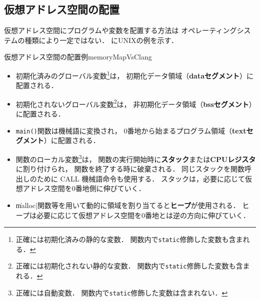 \subsection{仮想アドレス空間の配置}
仮想アドレス空間にプログラムや変数を配置する方法は
オペレーティングシステムの種類により一定ではない．
にUNIXの例を示す．

{仮想アドレス空間の配置例}{memoryMapVsClang}

\begin{itemize}
\item 初期化済みのグローバル変数\footnote{
正確には初期化済みの静的な変数．
関数内で{\tt static}修飾した変数も含まれる．}は，
初期化データ領域（{\bf dataセグメント}）に配置される．
\item 初期化されないグローバル変数\footnote{
正確には初期化されない静的な変数．
関数内で{\tt static}修飾した変数も含まれる．}は，
非初期化データ領域（{\bf bssセグメント}）に配置される．
\item {\tt main()}関数は機械語に変換され，
0番地から始まるプログラム領域（{\bf textセグメント}）に配置される．
\item 関数のローカル変数\footnote{
正確には自動変数．
関数内で{\tt static}修飾した変数は含まれない．}は，
関数の実行開始時に{\bf スタック}または{\bf CPUレジスタ}に割り付けられ，
関数を終了する時に破棄される．
同じスタックを関数呼出しのために CALL 機械語命令も使用する．
スタックは，必要に応じて仮想アドレス空間を0番地側に伸びていく．
\item \|malloc|関数等を用いて動的に領域を割り当てると{\bf ヒープ}が使用される．
ヒープは必要に応じて仮想アドレス空間を0番地とは逆の方向に伸びていく．
\end{itemize}

\begin{figure}
\begin{quote}

\end{quote}
\end{figure}
